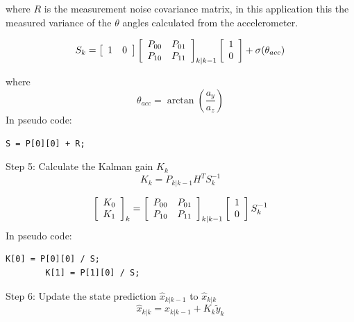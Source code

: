 \documentclass[a4paper]{report}
\begin{document}
		where $R$ is the measurement noise covariance matrix, in this application this the measured variance of the $\theta$ angles calculated from the accelerometer.

		\begin{equation}
		S_{k}=
		\left[
		\begin{array}{c c}
		1	&	0
		\end{array} \right]
		\left[
		\begin{array}{c c}
		P_{00}	&	P_{01}\\
		P_{10}	&	P_{11}
		\end{array} \right]_{k|k-1}
		\left[
		\begin{array}{c}
		1\\
		0
		\end{array} \right]
		+ \sigma(\theta_{acc})
		\end{equation}

		where
		\begin{equation*}
		\theta_{acc}=\arctan{\left(\frac{a_{y}}{a_{z}}\right)}
		 \end{equation*}
    In pseudo code:
		\begin{lstlisting}[frame=single]
		S = P[0][0] + R;
		\end{lstlisting}
		Step 5: Calculate the Kalman gain $K_{k}$
		\begin{equation}
		K_{k}=P_{k|k-1}H^{T}S^{-1}_{k}
		\end{equation}

		\begin{equation}
		\left[
		\begin{array}{c}
		K_{0}\\
		K_{1}
		\end{array} \right]_{k}
		=
		\left[
		\begin{array}{c c}
		P_{00}	&	P_{01}\\
		P_{10}	&	P_{11}
		\end{array}  \right]_{k|k-1}
		\left[
		\begin{array}{c}
		1\\
		0
		\end{array} \right]
		S^{-1}_{k}
		\end{equation}
    In pseudo code:
		\begin{lstlisting}[frame=single]
		K[0] = P[0][0] / S;
		K[1] = P[1][0] / S;
		\end{lstlisting}
		Step 6: Update the state prediction $\hat{x}_{k|k-1}$ to  $\hat{x}_{k|k}$
		\begin{equation}
		\hat{x}_{k|k}=\hat{x}_{k|k-1}+K_{k}\tilde{y}_{k}
		\end{equation}
\end{document}
